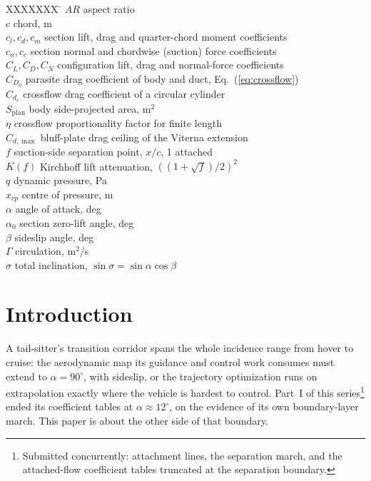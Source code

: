 \documentclass[submit]{aiaa-tc}
\begin{document}
\begin{tabbing}
  XXXXXXX \= \kill
  $A\!R$ \> aspect ratio \\
  $c$ \> chord, m \\
  $c_l, c_d, c_m$ \> section lift, drag and quarter-chord moment coefficients \\
  $c_n, c_c$ \> section normal and chordwise (suction) force coefficients \\
  $C_L, C_D, C_N$ \> configuration lift, drag and normal-force coefficients \\
  $C_{D_0}$ \> parasite drag coefficient of body and duct, Eq.~(\ref{eq:crossflow}) \\
  $C_{d_c}$ \> crossflow drag coefficient of a circular cylinder \\
  $S_{\mathrm{plan}}$ \> body side-projected area, m$^2$ \\
  $\eta$ \> crossflow proportionality factor for finite length \\
  $C_{d,\max}$ \> bluff-plate drag ceiling of the Viterna extension \\
  $f$ \> suction-side separation point, $x/c$, 1 attached \\
  $K(f)$ \> Kirchhoff lift attenuation, $((1+\sqrt{f})/2)^2$ \\
  $q$ \> dynamic pressure, Pa \\
  $x_{cp}$ \> centre of pressure, m \\
  $\alpha$ \> angle of attack, deg \\
  $\alpha_0$ \> section zero-lift angle, deg \\
  $\beta$ \> sideslip angle, deg \\
  $\Gamma$ \> circulation, m$^2$/s \\
  $\sigma$ \> total inclination, $\sin\sigma = \sin\alpha\cos\beta$ \\
\end{tabbing}

\section{Introduction}

A tail-sitter's transition corridor spans the whole incidence range from
hover to cruise: the aerodynamic map its guidance and control work
consumes must extend to $\alpha = 90^\circ$, with sideslip, or the
trajectory optimization runs on extrapolation exactly where the vehicle
is hardest to control. Part~I of this series\footnote{Submitted
concurrently: attachment lines, the separation march, and the
attached-flow coefficient tables truncated at the separation boundary.}
ended its coefficient tables at $\alpha \approx 12^\circ$, on the
evidence of its own boundary-layer march. This paper is about the other
side of that boundary.
\end{document}
